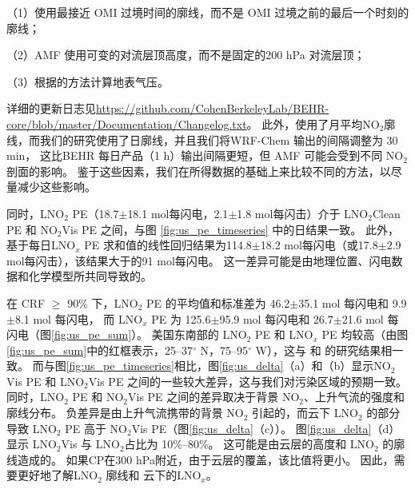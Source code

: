 （1）使用最接近 OMI 过境时间的廓线，而不是 OMI 过境之前的最后一个时刻的廓线；

（2）AMF 使用可变的对流层顶高度，而不是固定的200 hPa 对流层顶；

（3）根据\citet{Zhou.2009}的方法计算地表气压。

详细的更新日志见\url{https://github.com/CohenBerkeleyLab/BEHR-core/blob/master/Documentation/Changelog.txt}。
此外，\citet{Lapierre.2020}使用了月平均NO$_2$廓线，而我们的研究使用了日廓线，并且我们将WRF-Chem 输出的间隔调整为 30 min，
这比BEHR 每日产品（1 h）输出间隔更短，但 AMF 可能会受到不同 NO$_2$ 剖面的影响。
鉴于这些因素，我们在所得数据的基础上来比较不同的方法，以尽量减少这些影响。

同时，LNO$_2$ PE（18.7$\pm$18.1 mol每闪电，2.1$\pm$1.8 mol每闪击）介于 LNO$_2$Clean PE 和 NO$_2$Vis PE 之间，与图 \ref{fig:us_pe_timeseries} 中的日结果一致。
此外，基于每日LNO$_x$ PE 求和值的线性回归结果为114.8$\pm$18.2 mol每闪电（或17.8$\pm$2.9 mol每闪击），该结果大于\citet{Pickering.2016}的91 mol每闪电。
这一差异可能是由地理位置、闪电数据和化学模型所共同导致的。

在 CRF $\geq$ 90\% 下，LNO$_2$ PE 的平均值和标准差为 46.2$\pm$35.1 mol 每闪电和 9.9$\pm$8.1 mol 每闪电，
而 LNO$_x$ PE 为 125.6$\pm$95.9 mol 每闪电和 26.7$\pm$21.6 mol 每闪电（图\ref{fig:us_pe_sum}）。
美国东南部的 LNO$_2$ PE 和 LNO$_x$ PE 均较高（由图\ref{fig:us_pe_sum}中的红框表示，25--37$^{\circ}$ N，75--95$^{\circ}$ W），这与\citet{Lapierre.2020} 和 \citet{Bucsela.2019}的研究结果相一致。
而与图\ref{fig:us_pe_timeseries}相比，图\ref{fig:us_delta}（a）和（b）显示NO$_2$Vis PE 和 LNO$_2$Vis PE 之间的一些较大差异，这与我们对污染区域的预期一致。
同时，LNO$_2$ PE 和 NO$_2$Vis PE 之间的差异取决于背景 NO$_2$、上升气流的强度和廓线分布。
负差异是由上升气流携带的背景 NO$_2$ 引起的，而云下 LNO$_2$ 的部分导致 LNO$_2$ PE 高于 NO$_2$Vis PE（图\ref{fig:us_delta}（c））。
图\ref{fig:us_delta}（d） 显示 LNO$_2$Vis 与 LNO$_2$占比为 10\%--80\%。
这可能是由云层的高度和 LNO$_2$ 的廓线造成的。
如果CP在300 hPa附近，由于云层的覆盖，该比值将更小。
因此，需要更好地了解LNO$_2$ 廓线和 云下的LNO$_x$。


